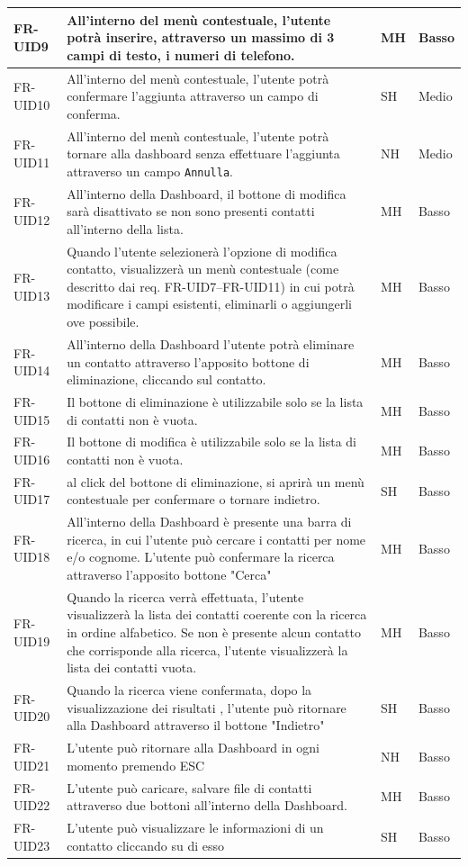 \documentclass[a4paper,12pt]{article}
\begin{document}
\begin{longtable}{|l|p{8cm}|l|l|}
        \hline
        FR-UID9  & All'interno del menù contestuale, l'utente potrà inserire,
        attraverso un massimo di 3 campi di testo, i numeri di telefono. & MH & Basso \\
        \hline
        FR-UID10 & All'interno del menù contestuale, l'utente potrà confermare
        l'aggiunta attraverso un campo di conferma. & SH & Medio \\
        \hline
        FR-UID11 & All'interno del menù contestuale, l'utente potrà tornare alla dashboard
        senza effettuare l'aggiunta attraverso un campo \texttt{Annulla}. & NH & Medio \\
        \hline
        FR-UID12 & All'interno della Dashboard, il bottone di modifica sarà disattivato
        se non sono presenti contatti all'interno della lista. & MH & Basso \\
        \hline
        FR-UID13 & Quando l'utente selezionerà l'opzione di modifica contatto, visualizzerà
        un menù contestuale (come descritto dai req. FR-UID7--FR-UID11) in cui potrà
        modificare i campi esistenti, eliminarli o aggiungerli ove possibile. & MH & Basso \\
        \hline
        FR-UID14 & All'interno della Dashboard l'utente potrà eliminare un contatto
        attraverso l'apposito bottone di eliminazione, cliccando sul contatto. & MH & Basso \\
        \hline
        FR-UID15 & Il bottone di eliminazione è utilizzabile solo se la lista di contatti non è vuota. & MH & Basso \\ \hline
        FR-UID16  & Il bottone di modifica è utilizzabile solo se la lista di contatti non è vuota. & MH & Basso \\ \hline
        FR-UID17 & al click del bottone di eliminazione, si aprirà un menù contestuale per confermare o tornare indietro. & SH & Basso \\ \hline
        FR-UID18 & All'interno della Dashboard è presente una barra di ricerca, in cui l'utente può cercare i contatti per nome e/o cognome. L'utente può confermare la ricerca attraverso l'apposito bottone "Cerca" & MH & Basso \\ \hline
        FR-UID19 & Quando la ricerca verrà effettuata, l'utente visualizzerà la lista dei contatti coerente con la ricerca in ordine alfabetico. Se non è presente alcun contatto che corrisponde alla ricerca, l'utente visualizzerà la lista dei contatti vuota. & MH & Basso \\ \hline
        FR-UID20 & Quando la ricerca viene confermata, dopo la visualizzazione dei risultati , l'utente può ritornare alla Dashboard attraverso il bottone "Indietro" & SH & Basso \\ \hline
        FR-UID21 & L'utente può ritornare alla Dashboard in ogni momento premendo ESC & NH & Basso \\ \hline
        FR-UID22 & L'utente può caricare, salvare file di contatti attraverso due bottoni all'interno della Dashboard. & MH & Basso \\ \hline
        FR-UID23 & L'utente può visualizzare le informazioni di un contatto cliccando su di esso & SH & Basso \\ \hline
    \end{longtable}
\end{document}
